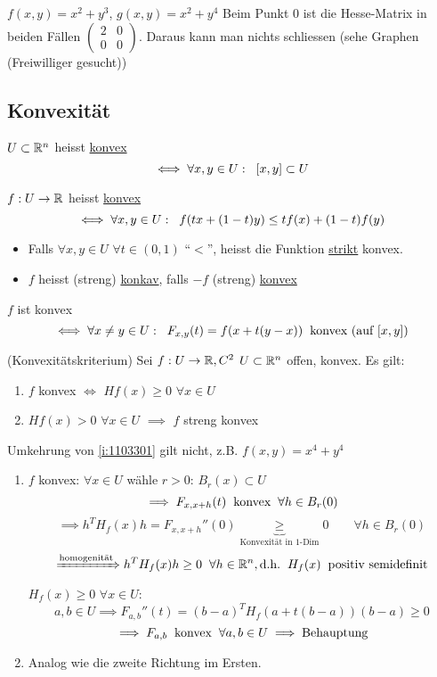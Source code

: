 \begin{Bsp}
  $f(x,y)=x^2+y^3$, $g(x,y)=x^2+y^4$
  Beim Punkt 0 ist die Hesse-Matrix in beiden Fällen $\begin{pmatrix} 2&0\\ 0&0 \end{pmatrix}$. Daraus kann man nichts schliessen (sehe Graphen (Freiwilliger gesucht))
\end{Bsp}
\subsection{Konvexität}
\begin{Def}
  $U\subset\mathbb{R}^n$ heisst \ul{konvex}
  \[\iff \forall x,y\in U: \hspace{2mm} \left[ x,y \right]\subset U\]
\end{Def}
\begin{Def}
  $f:U\rightarrow\mathbb{R}$ heisst \ul{konvex}
  \[\iff \forall x,y\in U:\hspace{2mm} f(tx+(1-t)y)\leq tf(x)+(1-t)f(y)\]
  \begin{itemize}
    \item Falls $\forall x,y\in U$ $\forall t\in (0,1)$ ``$<$'', heisst die Funktion \ul{strikt} konvex.
    \item $f$ heisst (streng) \ul{konkav}, falls $-f$ (streng) \ul{konvex}
  \end{itemize}
\end{Def}
\begin{Bem}
  $f$ ist konvex
  \[\iff \forall x\neq y\in U:\hspace{2mm} F_{x,y}(t)=f(x+t(y-x))\hspace{2mm}\text{konvex (auf $\left[ x,y \right]$)}\]
\end{Bem}
\begin{Sat}
  (Konvexitätskriterium)
  Sei $f:U\rightarrow\mathbb{R}, C^2$ $U\subset\mathbb{R}^n$ offen, konvex. Es gilt:
  \begin{enumerate}
    \item $f$ konvex $\iff$ $H f(x)\geq 0$ $\forall x\in U$
      \label{i:1103301}
    \item $H f(x)>0$ $\forall x\in U$ $\implies$ $f$ streng konvex
      \label{i:1103302}
  \end{enumerate}
\end{Sat}
\begin{Bem}
  Umkehrung von \ref{i:1103301} gilt nicht, z.B. $f(x,y)=x^4+y^4$
\end{Bem}
\begin{Bew}
  \begin{enumerate}
    \item $f$ konvex: $\forall x\in U$ wähle $r>0$: $B_r(x)\subset U$
      \[\implies F_{x,x+h}(t)\hspace{2mm}\text{konvex}\hspace{2mm}\forall h\in B_r(0)\]
      \[\implies h^TH_f(x)h=F_{x,x+h}''(0)\underbrace{\geq}_{\text{Konvexität in 1-Dim}} 0\qquad\forall h\in B_r(0)\]
      \[\xRightarrow{\text{homogenität}}h^TH_f(x)h\geq 0\hspace{2mm}\forall h\in \mathbb{R}^n, \text{d.h.}\hspace{2mm} H_f(x)\hspace{2mm}\text{positiv semidefinit}\]
      $H_f(x)\geq 0$ $\forall x\in U$:
      \[a,b\in U\implies F_{a,b}''(t)=(b-a)^TH_f(a+t(b-a))(b-a)\geq 0\]
      \[\implies F_{a,b} \hspace{2mm}\text{konvex}\hspace{2mm}\forall a,b\in U\implies\text{Behauptung}\]
    \item Analog wie die zweite Richtung im Ersten.
  \end{enumerate}
\end{Bew}
